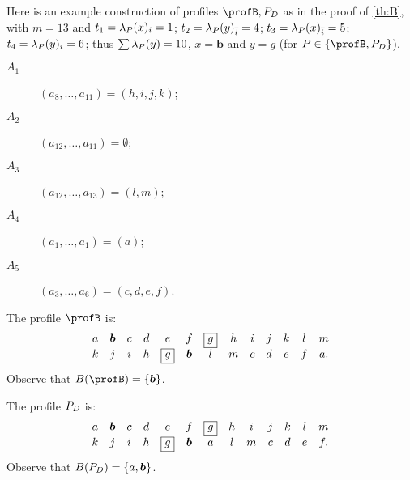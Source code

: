 \documentclass[pagesize, twoside=off, bibliography=totoc, DIV=calc, fontsize=12pt, a4paper]{scrartcl}
\begin{document}
\begin{example}
Here is an example construction of profiles $\profB, \profD$ as in the proof of \cref{th:B}, with $m = 13$ and $t_1 = \lambda_P(x)_i = 1$; $t_2 = \lambda_P(y)_{\overline{i}} = 4$; $t_3 = \lambda_P(x)_{\overline{i}} = 5$; $t_4 = \lambda_P(y)_i = 6$; thus $\sum \lambda_P(y) = 10$, $x = \bm{b}$ and $y = \boxed{g}$ (for $\prof \in \set{\profB, \profD}$).
	\begin{description}
		\item[$A_1$] $(a_8, …, a_{11}) = (h, i, j, k)$;
		\item[$A_2$] $(a_{12}, …, a_{11}) = \emptyset$;
		\item[$A_3$] $(a_{12}, …, a_{13}) = (l, m)$;
		\item[$A_4$] $(a_1, …, a_1) = (a)$;
		\item[$A_5$] $(a_3, …, a_6) = (c, d, e, f)$.
	\end{description}

	The profile $\profB$ is:
  \begin{equation}
    \begin{array}{*{13}c}
      a&\bm{b}&c&d&e&f&\boxed{g}&h&i&j&k&l&m\\
      k&j&i&h&\boxed{g}&\bm{b}&l&m&c&d&e&f&a.
    \end{array}
  \end{equation}
	Observe that $B(\profB) = \set{\bm{b}}$.

	The profile $P_D$ is:
  \begin{equation}
    \begin{array}{*{13}c}
      a&\bm{b}&c&d&e&f&\boxed{g}&h&i&j&k&l&m\\
      k&j&i&h&\boxed{g}&\bm{b}&a&l&m&c&d&e&f.
    \end{array}
  \end{equation}
	Observe that $B(P_D) = \{a, \bm{b}\}$.
\end{example}
\end{document}
